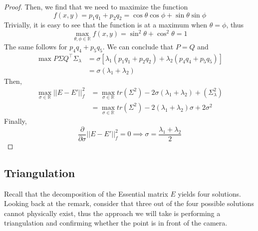 \documentclass{article}
\begin{document}
\begin{proof}
    Then, we find that we need to maximize the function
        $$f(x,y) = p_1q_1+p_2q_2 = \cos{\theta}\cos\phi + \sin\theta \sin\phi$$
    Trivially, it is easy to see that the function is at a maximum when $\theta=\phi$, thus
    $$\max_{\theta,\phi\in\mathbb{R}} f(x, y) = \sin^2\theta + \cos^2\theta = 1$$
    The same follows for $p_4q_4+p_5q_5$. We can conclude that $P = Q$ and 
    \begin{align*}
        \max P\Sigma Q^\top\Sigma_\lambda &= \sigma[\lambda_1(p_1q_1 + p_2q_2) + \lambda_2(p_4q_4+p_5q_5)]\\
        &= \sigma(\lambda_1 + \lambda_2)
    \end{align*}
    Then, 
        \begin{align*}
        \max_{\sigma \in \mathbb{R}} ||E-E'||_f^2 &=\max_{\sigma \in \mathbb{R}} tr(\Sigma^2) -2\sigma(\lambda_1 + \lambda_2)+(\Sigma_\lambda^2)\\
        &= \max_{\sigma \in \mathbb{R}} tr(\Sigma^2) -2(\lambda_1 + \lambda_2)\sigma+2\sigma^2
    \end{align*}
    Finally, 
    $$\dfrac{\partial}{\partial\sigma}||E-E'||_f^2 = 0 \implies \sigma = \dfrac{\lambda_1 + \lambda_2}{2}$$
\end{proof}

\subsection{Triangulation}
Recall that the decomposition of the Essential matrix $E$ yields four solutions. Looking back at the remark, consider that three out of the four possible solutions cannot physically exist, thus the approach we will take is performing a triangulation and confirming whether the point is in front of the camera.
\end{document}
